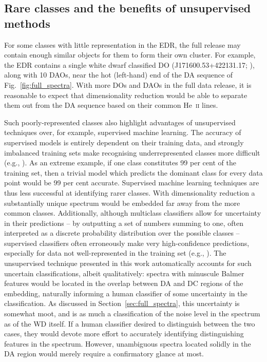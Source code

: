 \documentclass[fleqn,usenatbib]{mnras}
\begin{document}
\subsection{Rare classes and the benefits of unsupervised methods}
\label{sec:rare}

For some classes with little representation in the EDR, the full release may contain enough similar objects for them to form their own cluster.
For example, the EDR contains a single white dwarf classified DO (J171600.53+422131.17; \citealt{manser24}), along with 10 DAOs, near the hot (left-hand) end of the DA sequence of Fig.~\ref{fig:full_spectra}.
With more DOs and DAOs in the full data release, it is reasonable to expect that dimensionality reduction would be able to separate them out from the DA sequence based on their common He~\textsc{ii} lines.

Such poorly-represented classes also highlight advantages of unsupervised techniques over, for example, supervised machine learning.
The accuracy of supervised models is entirely dependent on their training data, and strongly imbalanced training sets make recognising underrepresented classes more difficult (e.g., \citealt{he09, johnson19, das23}).
As an extreme example, if one class constitutes 99 per cent of the training set, then a trivial model which predicts the dominant class for every data point would be 99 per cent accurate.
Supervised machine learning techniques are thus less successful at identifying rarer classes.
With dimensionality reduction a substantially unique spectrum would be embedded far away from the more common classes.
Additionally, although multiclass classifiers allow for uncertainty in their predictions -- by outputting a set of numbers summing to one, often interpreted as a discrete probability distribution over the possible classes -- supervised classifiers often erroneously make very high-confidence predictions, especially for data not well-represented in the training set (e.g., \citealt{nguyen15, guo17, hein19}).
The unsupervised technique presented in this work automatically accounts for such uncertain classifications, albeit qualitatively: spectra with minuscule Balmer features would be located in the overlap between DA and DC regions of the embedding, naturally informing a human classifier of some uncertainty in the classification.
As discussed in Section~\ref{sec:full_spectra}, this uncertainty is somewhat moot, and is as much a classification of the noise level in the spectrum as of the WD itself.
If a human classifier desired to distinguish between the two cases, they would devote more effort to accurately identifying distinguishing features in the spectrum.
However, unambiguous spectra located solidly in the DA region would merely require a confirmatory glance at most.
\end{document}
